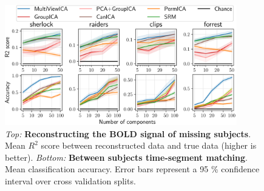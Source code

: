 \begin{figure}
  \centering
  \includegraphics[width=0.9\textwidth]{figures/mvica/timesegment_matching_reconstruction.pdf}
  \caption{\emph{Top:} \textbf{Reconstructing the BOLD signal of
      missing subjects}. Mean $R^2$ score between reconstructed data and true
    data (higher is better). \emph{Bottom:} \textbf{Between subjects time-segment matching}. Mean
    classification accuracy. Error bars represent a 95 \% confidence interval over cross validation splits.}
  \label{fig:reconstruction}
  \label{fig:timesegment}
\end{figure}


